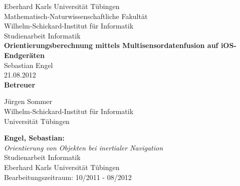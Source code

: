 \documentclass[twoside,12pt,a4paper]{report}
\begin{document}
\setlength\parindent{0pt} 


 
\begin{titlepage}
	\begin{center}
  		{\LARGE Eberhard Karls Universität Tübingen}\\
		{\large Mathematisch-Naturwissenschaftliche Fakultät \\
		Wilhelm-Schickard-Institut für Informatik\\[4cm]}
  		{\huge Studienarbeit Informatik\\[2cm]}
  		{\Large\bf  Orientierungsberechnung mittels Multisensordatenfusion auf iOS-Endgeräten\\[1.5cm]}
 		{\large Sebastian Engel}\\[0.5cm]
		21.08.2012 \\[4cm]
		{\small\bf Betreuer}\\[0.5cm]
  		\parbox{7cm}{
  			\begin{center}
				{\large Jürgen Sommer}\\
	  			{\footnotesize Wilhelm-Schickard-Institut für Informatik\\
				Universität Tübingen}
			\end{center}
 		}
 	\end{center}
\end{titlepage}


\thispagestyle{empty}
\vspace*{\fill}
\begin{minipage}{11.2cm}
\textbf{Engel, Sebastian:}\\
\emph{Orientierung von Objekten bei inertialer Navigation}\\ Studienarbeit Informatik\\
Eberhard Karls Universität Tübingen\\
Bearbeitungszeitraum: 10/2011 - 08/2012
\end{minipage}
\newpage


\setcounter{page}{1}
\end{document}

